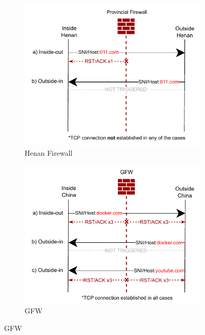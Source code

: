 \documentclass[conference,compsoc]{IEEEtran}
\begin{document}
\begin{figure}[t]
  \centering
  \begin{subfigure}[b]{0.48\textwidth}
    \centering
    \includegraphics[width=\linewidth]{figures/henan-inside-outside.pdf}
    \caption{Henan Firewall}
    \label{fig:henan-inside-outside}
  \end{subfigure}
  \hfill
  \begin{subfigure}[b]{0.48\textwidth}
    \centering
    \includegraphics[width=\linewidth]{figures/gfw-inside-outside.pdf}
    \caption{GFW}
    \label{fig:gfw-inside-outside}
  \end{subfigure}


\end{figure}
\end{document}
